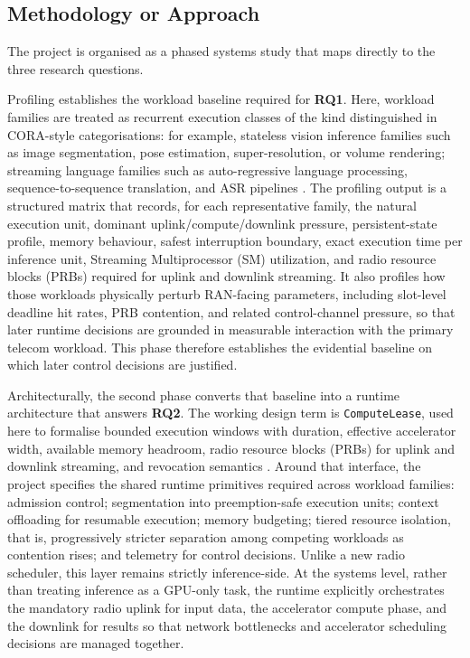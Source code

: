 \documentclass[a4paper,11pt]{article}
\begin{document}
\subsection{Methodology or Approach}

The project is organised as a phased systems study that maps directly to the three research questions.

Profiling establishes the workload baseline required for \textbf{RQ1}. Here, workload families are treated as recurrent execution classes of the kind distinguished in CORA-style categorisations: for example, stateless vision inference families such as image segmentation, pose estimation, super-resolution, or volume rendering; streaming language families such as auto-regressive language processing, sequence-to-sequence translation, and ASR pipelines \cite{cora,slaairan}. The profiling output is a structured matrix that records, for each representative family, the natural execution unit, dominant uplink/compute/downlink pressure, persistent-state profile, memory behaviour, safest interruption boundary, exact execution time per inference unit, Streaming Multiprocessor (SM) utilization, and radio resource blocks (PRBs) required for uplink and downlink streaming. It also profiles how those workloads physically perturb RAN-facing parameters, including slot-level deadline hit rates, PRB contention, and related control-channel pressure, so that later runtime decisions are grounded in measurable interaction with the primary telecom workload. This phase therefore establishes the evidential baseline on which later control decisions are justified.

Architecturally, the second phase converts that baseline into a runtime architecture that answers \textbf{RQ2}. The working design term is \texttt{ComputeLease}, used here to formalise bounded execution windows with duration, effective accelerator width, available memory headroom, radio resource blocks (PRBs) for uplink and downlink streaming, and revocation semantics \cite{cora,slaairan}. Around that interface, the project specifies the shared runtime primitives required across workload families: admission control; segmentation into preemption-safe execution units; context offloading for resumable execution; memory budgeting; tiered resource isolation, that is, progressively stricter separation among competing workloads as contention rises; and telemetry for control decisions. Unlike a new radio scheduler, this layer remains strictly inference-side. At the systems level, rather than treating inference as a GPU-only task, the runtime explicitly orchestrates the mandatory radio uplink for input data, the accelerator compute phase, and the downlink for results so that network bottlenecks and accelerator scheduling decisions are managed together.
\end{document}
